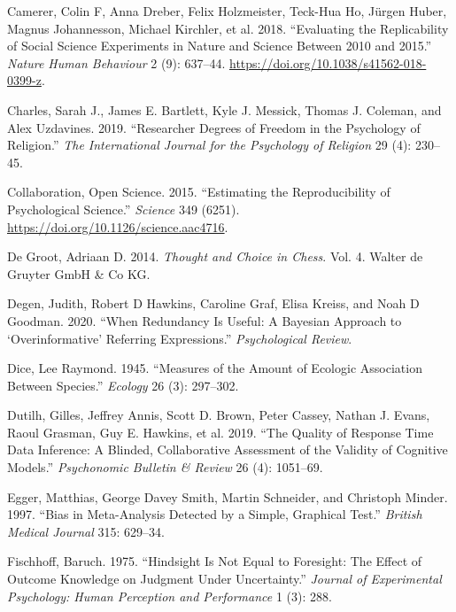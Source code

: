 \documentclass[
  12pt,
]{article}
\newlength{\cslhangindent}
\newenvironment{CSLReferences}[2] %
 {%
  \setlength{\parindent}{0pt}
  \ifodd #1 \everypar{\setlength{\hangindent}{\cslhangindent}}\ignorespaces\fi
  \ifnum #2 > 0
  \setlength{\parskip}{#2\baselineskip}
  \fi
 }%
 {}
\begin{document}
\begin{CSLReferences}{1}{0}
\leavevmode{}%
Camerer, Colin F, Anna Dreber, Felix Holzmeister, Teck-Hua Ho, Jürgen Huber, Magnus Johannesson, Michael Kirchler, et al. 2018. {``Evaluating the Replicability of Social Science Experiments in Nature and Science Between 2010 and 2015.''} \emph{Nature Human Behaviour} 2 (9): 637--44. \url{https://doi.org/10.1038/s41562-018-0399-z}.

\leavevmode{}%
Charles, Sarah J., James E. Bartlett, Kyle J. Messick, Thomas J. Coleman, and Alex Uzdavines. 2019. {``Researcher Degrees of Freedom in the Psychology of Religion.''} \emph{The International Journal for the Psychology of Religion} 29 (4): 230--45.

\leavevmode{}%
Collaboration, Open Science. 2015. {``Estimating the Reproducibility of Psychological Science.''} \emph{Science} 349 (6251). \url{https://doi.org/10.1126/science.aac4716}.

\leavevmode{}%
De Groot, Adriaan D. 2014. \emph{Thought and Choice in Chess}. Vol. 4. Walter de Gruyter GmbH \& Co KG.

\leavevmode{}%
Degen, Judith, Robert D Hawkins, Caroline Graf, Elisa Kreiss, and Noah D Goodman. 2020. {``When Redundancy Is Useful: A Bayesian Approach to {`Overinformative'} Referring Expressions.''} \emph{Psychological Review}.

\leavevmode{}%
Dice, Lee Raymond. 1945. {``Measures of the Amount of Ecologic Association Between Species.''} \emph{Ecology} 26 (3): 297--302.

\leavevmode{}%
Dutilh, Gilles, Jeffrey Annis, Scott D. Brown, Peter Cassey, Nathan J. Evans, Raoul Grasman, Guy E. Hawkins, et al. 2019. {``The Quality of Response Time Data Inference: A Blinded, Collaborative Assessment of the Validity of Cognitive Models.''} \emph{Psychonomic Bulletin \& Review} 26 (4): 1051--69.

\leavevmode{}%
Egger, Matthias, George Davey Smith, Martin Schneider, and Christoph Minder. 1997. {``Bias in Meta-Analysis Detected by a Simple, Graphical Test.''} \emph{British Medical Journal} 315: 629--34.

\leavevmode{}%
Fischhoff, Baruch. 1975. {``Hindsight Is Not Equal to Foresight: The Effect of Outcome Knowledge on Judgment Under Uncertainty.''} \emph{Journal of Experimental Psychology: Human Perception and Performance} 1 (3): 288.


\end{CSLReferences}
\end{document}
